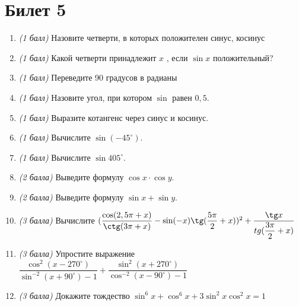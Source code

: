 \documentclass[12pt, a4paper]{article}
\begin{document}
\section*{Билет 5}
\begin{enumerate}
	\item \textit{(1 балл)}	Назовите четверти, в которых положителен синус, косинус 
	\item \textit{(1 балл)}	Какой четверти принадлежит $x$ , если $\sin x$ положительный?
	\item \textit{(1 балл)}	Переведите 90 градусов в радианы
	\item \textit{(1 балл)}	Назовите угол, при котором $\sin$  равен $0,5$.
	\item \textit{(1 балл)}	Выразите котангенс через синус и косинус.
	\item \textit{(1 балл)} Вычислите $\sin (-45^{\circ})$.
	\item \textit{(1 балл)}	Вычислите $\sin 405^{\circ}$.
	\item \textit{(2 балла)} Выведите формулу $\cos x \cdot \cos y$.
	\item \textit{(2 балла)} Выведите формулу $\sin x + \sin y$.
	\item \textit{(3 балла)} Вычислите $(\dfrac{\cos (2,5\pi + x)}{\ctg (3\pi + x)} - \sin (-x) \tg (\dfrac{5\pi}{2}+x))^2 + \dfrac{\tg x}{tg (\dfrac{3\pi}{2}+x)}$
	\item \textit{(3 балла)} Упростите выражение $\dfrac{\cos^2 (x-270^{\circ})}{\sin^{-2}(x+90^{\circ})-1}+\dfrac{\sin^2 (x+270^{\circ})}{\cos^{-2}(x-90^{\circ})-1}$
	\item \textit{(3 балла)} Докажите тождество $\sin^6x + \cos^6x + 3\sin^2x\cos^2x = 1$
\end{enumerate}
\end{document}
